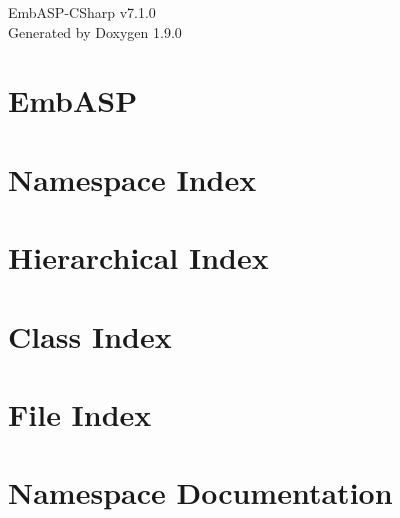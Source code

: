 \let\mypdfximage\pdfximage\def\pdfximage{\immediate\mypdfximage}\documentclass[twoside]{book}
\newcommand{\+}{\discretionary{\mbox{\scriptsize$\hookleftarrow$}}{}{}}
\newcommand{\clearemptydoublepage}{%
  \newpage{\pagestyle{empty}\cleardoublepage}%
}
\begin{document}
\raggedbottom

\hypersetup{pageanchor=false,
             bookmarksnumbered=true,
             pdfencoding=unicode
            }
\begin{titlepage}
\vspace*{7cm}
\begin{center}%
{\Large Emb\+ASP-\/\+CSharp v7.1.0 }\\
\vspace*{1cm}
{\large Generated by Doxygen 1.9.0}\\
\end{center}
\end{titlepage}
\clearemptydoublepage
{}
\tableofcontents
\clearemptydoublepage
{}
\hypersetup{pageanchor=true}

\chapter{Emb\+ASP}
\label{index}\hypertarget{index}{}
\chapter{Namespace Index}

\chapter{Hierarchical Index}

\chapter{Class Index}

\chapter{File Index}

\chapter{Namespace Documentation}













\end{document}
